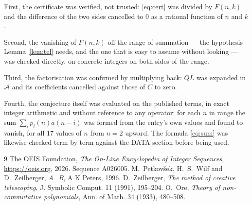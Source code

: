 \documentclass[11pt,a4paper]{article}
\theoremstyle{plain}
\theoremstyle{definition}
\begin{document}
First, the certificate was verified, not trusted: \eqref{eq:cert} was divided by $F(n,k)$
and the difference of the two sides cancelled to $0$ as a rational function of $n$ and
$k$.

Second, the vanishing of $F(n,k)$ off the range of summation --- the hypothesis
Lemma~\ref{lem:tel} needs, and the one that is easy to assume without looking --- was
checked directly, on concrete integers on both sides of the range.

Third, the factorisation was confirmed by multiplying back: $QL$ was expanded in
$\mathcal{A}$ and its coefficients cancelled against those of $C$ to zero.

Fourth, the conjecture itself was evaluated on the published terms, in exact integer
arithmetic and without reference to any operator: for each $n$ in range the sum
$\sum_{i}p_{i}(n)a(n-i)$ was formed from the entry's own values and found to vanish, for
all 17 values of $n$ from $n=2$ upward. The formula \eqref{eq:sum} was
likewise checked term by term against the DATA section before being used.

\begin{thebibliography}{9}
 The OEIS Foundation, \emph{The On-Line Encyclopedia of Integer Sequences},
\url{https://oeis.org}, 2026. Sequence A026005.
 M.~Petkov\v{s}ek, H.~S.~Wilf and D.~Zeilberger, \emph{A=B}, A K Peters,
1996.
 D.~Zeilberger, \emph{The method of creative telescoping}, J. Symbolic
Comput. 11 (1991), 195--204.
 O.~Ore, \emph{Theory of non-commutative polynomials}, Ann. of Math. 34
(1933), 480--508.
\end{thebibliography}
\end{document}
